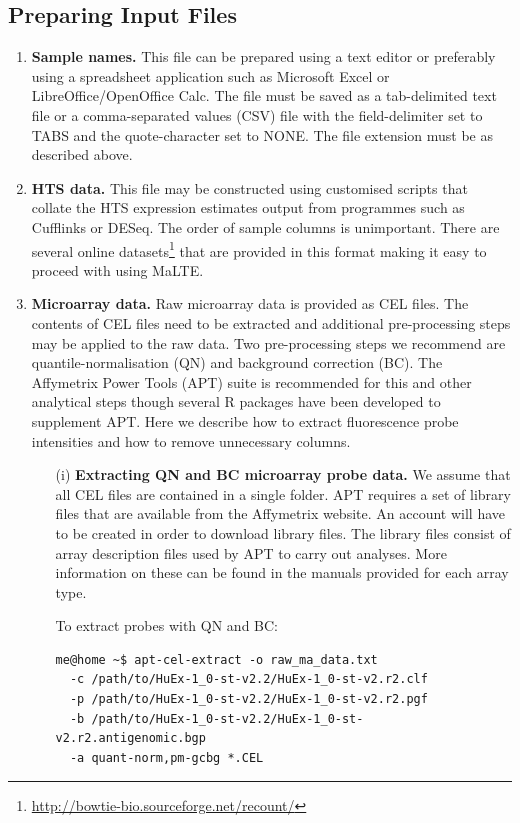 \documentclass[a4paper,12pt]{article}
\begin{document}
\subsection{Preparing Input Files}
\label{gep:prepare}
\begin{enumerate}
\item \textbf{Sample names.} This file can be prepared using a text editor or preferably using a spreadsheet application such as Microsoft Excel or LibreOffice/OpenOffice Calc. The file must be saved as a tab-delimited text file or a comma-separated values (CSV) file with the field-delimiter set to TABS and the quote-character set to NONE. The file extension must be as described above.

\item \textbf{HTS data.} This file may be constructed using customised scripts that collate the HTS expression estimates output from programmes such as \textsf{Cufflinks} or \textsf{DESeq}. The order of sample columns is unimportant. There are several online datasets\footnote{\url{http://bowtie-bio.sourceforge.net/recount/}} that are provided in this format making it easy to proceed with using \textsf{MaLTE}.

\item \textbf{Microarray data.} Raw microarray data is provided as CEL files. The contents of CEL files need to be extracted and additional pre-processing steps may be applied to the raw data. Two pre-processing steps we recommend are quantile-normalisation (QN) and background correction (BC). The Affymetrix Power Tools (APT) suite is recommended for this and other analytical steps though several \textsf{R} packages have been developed to supplement APT.  Here we describe how to extract fluorescence probe intensities and how to remove unnecessary columns.

\begin{enumerate}
\item[(i)] \textbf{Extracting QN and BC microarray probe data.} We assume that all CEL files are contained in a single folder. APT requires a set of library files that are available from the Affymetrix website. An account will have to be created in order to download library files. The library files consist of array description files used by APT to carry out analyses. More information on these can be found in the manuals provided for each array type. 

To extract probes with QN and BC:
\begin{verbatim}
me@home ~$ apt-cel-extract -o raw_ma_data.txt 
  -c /path/to/HuEx-1_0-st-v2.2/HuEx-1_0-st-v2.r2.clf 
  -p /path/to/HuEx-1_0-st-v2.2/HuEx-1_0-st-v2.r2.pgf 
  -b /path/to/HuEx-1_0-st-v2.2/HuEx-1_0-st-v2.r2.antigenomic.bgp 
  -a quant-norm,pm-gcbg *.CEL
\end{verbatim}


\end{enumerate}
\end{enumerate}
\end{document}
